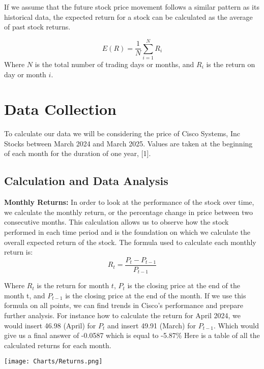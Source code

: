\documentclass[12]{amsart}
\begin{document}
\begin{flushleft}
If we assume that the future stock price movement follows a similar pattern as its historical data, the expected return for a stock can be calculated as the average of past stock returns.

\[
E(R) = \frac{1}{N} \sum_{i=1}^{N} R_i
\]
Where $N$ is the total number of trading days or months, and $R_i$ is the return on day or month $i$.
\section{Data Collection}
To calculate our data we will be considering the price of Cisco Systems, Inc Stocks between March 2024 and March 2025. Values are taken at the beginning of each month for the duration of one year, [1].
\bigbreak
{}




\begin{flushleft}
\subsection{Calculation and Data Analysis} 
\textbf{Monthly Returns:}
In order to look at the performance of the stock over time, we calculate the monthly return, or the percentage change in price between two consecutive months. This calculation allows us to observe how the stock performed in each time period and is the foundation on which we calculate the overall expected return of the stock. The formula used to calculate each monthly return is:
\[
R_t = \frac{P_t - P_{t-1}}{P_{t-1}}
\]
\begin{flushleft}
Where $R_t$ is the return for month $t$, $P_t$ is the closing price at the end of the month t, and $P_{t-1}$ is the closing price at the end of the month. If we use this formula on all points, we can find trends in Cisco's performance and prepare further analysis. For instance how to calculate the return for April 2024, we would insert 46.98 (April) for $P_t$ and insert 49.91 (March) for $P_{t-1}$. Which would give us a final answer of -0.0587 which is equal to -5.87\% Here is a table of all the calculated returns for each month. 
\end{flushleft}

\begin{center}
\texttt{[image: Charts/Returns.png]}
\end{center}

\bigbreak


\end{flushleft}
\end{flushleft}
\end{document}
